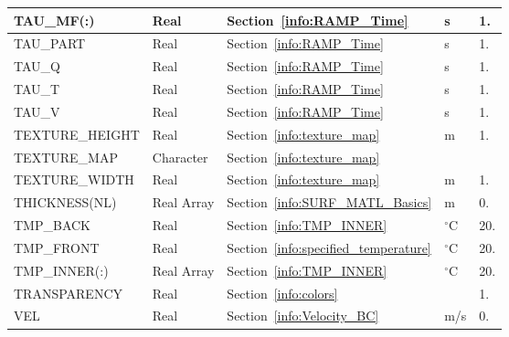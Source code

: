 \documentclass[11pt]{book}
\begin{document}
\begin{longtable}{@{\extracolsep{\fill}}|l|l|l|l|l|}
{\ct TAU\_MF(:)}                      & Real            & Section~\ref{info:RAMP_Time}              & s                   & 1.                      \\ \hline
{\ct TAU\_PART}                       & Real            & Section~\ref{info:RAMP_Time}              & s                   & 1.                      \\ \hline
{\ct TAU\_Q}                          & Real            & Section~\ref{info:RAMP_Time}              & s                   & 1.                      \\ \hline
{\ct TAU\_T}                          & Real            & Section~\ref{info:RAMP_Time}              & s                   & 1.                      \\ \hline
{\ct TAU\_V}                          & Real            & Section~\ref{info:RAMP_Time}              & s                   & 1.                      \\ \hline
{\ct TEXTURE\_HEIGHT}                 & Real            & Section~\ref{info:texture_map}            & m                   & 1.                      \\ \hline
{\ct TEXTURE\_MAP}                    & Character       & Section~\ref{info:texture_map}            &                     &                         \\ \hline
{\ct TEXTURE\_WIDTH}                  & Real            & Section~\ref{info:texture_map}            & m                   & 1.                      \\ \hline
{\ct THICKNESS(NL)}                   & Real Array      & Section~\ref{info:SURF_MATL_Basics}       & m                   & 0.                      \\ \hline
{\ct TMP\_BACK}                       & Real            & Section~\ref{info:TMP_INNER}              & $^\circ$C           & 20.                     \\ \hline
{\ct TMP\_FRONT}                      & Real            & Section~\ref{info:specified_temperature}  & $^\circ$C           & 20.                     \\ \hline
{\ct TMP\_INNER(:)}                   & Real Array      & Section~\ref{info:TMP_INNER}              & $^\circ$C           & 20.                     \\ \hline
{\ct TRANSPARENCY}                    & Real            & Section~\ref{info:colors}                 &                     & 1.                      \\ \hline
{\ct VEL    }                         & Real            & Section~\ref{info:Velocity_BC}            & m/s                 & 0.                      \\ \hline

\end{longtable}
\end{document}
